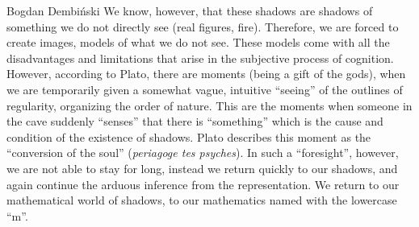 \begin{artengenv}{Bogdan Dembiński}
We know, however, that these shadows are shadows of
something we do not directly see (real figures, fire). Therefore, we are forced to create images, models of what we do
not see. These models come with all the disadvantages and limitations that arise in the subjective process of
cognition. However, according to Plato, there are moments (being a gift of the gods), when we are temporarily given a
somewhat vague, intuitive ``seeing'' of the outlines of regularity, organizing the order of nature.  This are the moments
when someone in the cave suddenly ``senses'' that there is ``something'' which is the cause and condition of the existence
of shadows. Plato describes\textbf{ }this moment as the ``conversion of the soul'' (\textit{periagoge tes psyches}). In
such a ``foresight'', however, we are not able to stay for long, instead we return quickly to our shadows, and again
continue the arduous inference from the representation. We return to our mathematical world of shadows, to our
mathematics named with the lowercase ``m''. 


\end{artengenv}
